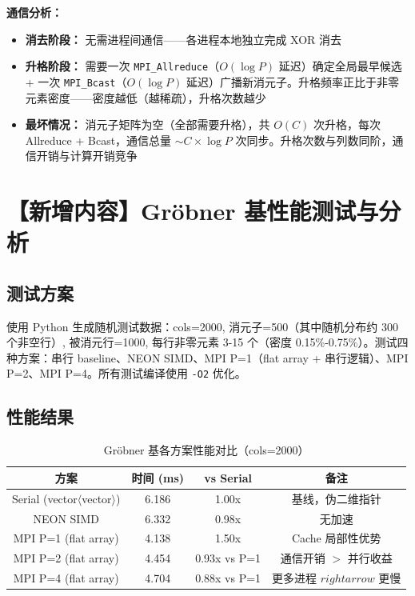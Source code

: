 \documentclass[a4paper]{article}
\begin{document}
\textbf{通信分析：}
\begin{itemize}
    \item \textbf{消去阶段：} 无需进程间通信——各进程本地独立完成 XOR 消去
    \item \textbf{升格阶段：} 需要一次 \texttt{MPI\_Allreduce}（$O(\log P)$ 延迟）确定全局最早候选 + 一次 \texttt{MPI\_Bcast}（$O(\log P)$ 延迟）广播新消元子。升格频率正比于非零元素密度——密度越低（越稀疏），升格次数越少
    \item \textbf{最坏情况：} 消元子矩阵为空（全部需要升格），共 $O(C)$ 次升格，每次 Allreduce + Bcast，通信总量 $\sim C \times \log P$ 次同步。升格次数与列数同阶，通信开销与计算开销竞争
\end{itemize}

\section{【新增内容】Gröbner 基性能测试与分析}

\subsection{测试方案}

使用 Python 生成随机测试数据：cols=2000, 消元子=500（其中随机分布约 300 个非空行）, 被消元行=1000, 每行非零元素 3-15 个（密度 0.15\%-0.75\%）。测试四种方案：串行 baseline、NEON SIMD、MPI P=1（flat array + 串行逻辑）、MPI P=2、MPI P=4。所有测试编译使用 \texttt{-O2} 优化。

\subsection{性能结果}

\begin{table}[H]
  \centering
  \caption{Gröbner 基各方案性能对比（cols=2000）}
  \label{table:groebner_perf}
  \begin{tabular}{|c|c|c|c|}
  \hline
  \textbf{方案} & \textbf{时间 (ms)} & \textbf{vs Serial} & \textbf{备注} \\
  \hline
  Serial (vector$\langle$vector$\rangle$) & 6.186 & 1.00x & 基线，伪二维指针 \\
  NEON SIMD & 6.332 & 0.98x & 无加速 \\
  MPI P=1 (flat array) & 4.138 & 1.50x & Cache 局部性优势 \\
  MPI P=2 (flat array) & 4.454 & 0.93x vs P=1 & 通信开销 $>$ 并行收益 \\
  MPI P=4 (flat array) & 4.704 & 0.88x vs P=1 & 更多进程 $rightarrow$ 更慢 \\
  \hline
  \end{tabular}
\end{table}
\end{document}
